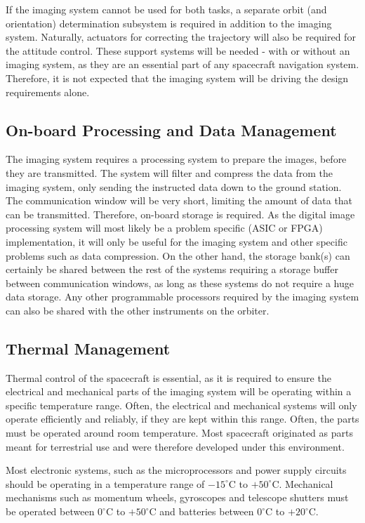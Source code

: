 If the imaging system cannot be used for both tasks, a separate orbit (and orientation) determination subsystem is required in addition to the imaging system. Naturally, actuators for correcting the trajectory will also be required for the attitude control. These support systems will be needed - with or without an imaging system, as they are an essential part of any spacecraft navigation system. Therefore, it is not expected that the imaging system will be driving the design requirements alone.
\subsection{On-board Processing and Data Management}
The imaging system requires a processing system to prepare the images, before they are transmitted. The system will filter and compress the data from the imaging system, only sending the instructed data down to the ground station. The communication window will be very short, limiting the amount of data that can be transmitted. Therefore, on-board storage is required. As the digital image processing system will most likely be a problem specific (ASIC or FPGA) implementation, it will only be useful for the imaging system and other specific problems such as data compression. On the other hand, the storage bank(s) can certainly be shared between the rest of the systems requiring a storage buffer between communication windows, as long as these systems do not require a huge data storage. Any other programmable processors required by the imaging system can also be shared with the other instruments on the orbiter.
\subsection{Thermal Management}
Thermal control of the spacecraft is essential, as it is required to ensure the electrical and mechanical parts of the imaging system will be operating within a specific temperature range\cite{fortescue2011a}. Often, the electrical and mechanical systems will only operate efficiently and reliably, if they are kept within this range. Often, the parts must be operated around room temperature. Most spacecraft originated as parts meant for terrestrial use and were therefore developed under this environment.

Most electronic systems, such as the microprocessors and power supply circuits should be operating in a temperature range of $-15^\circ$C to $+50^\circ$C. Mechanical mechanisms such as momentum wheels, gyroscopes and telescope shutters must be operated between $0^\circ$C to $+50^\circ$C and batteries between $0^\circ$C to $+20^\circ$C\cite{fortescue2011a}.

